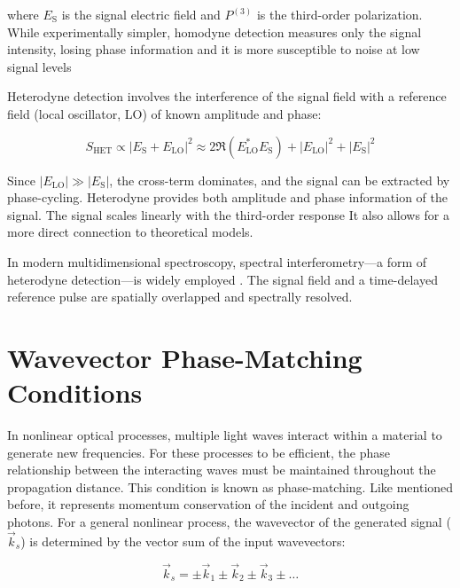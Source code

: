 \noindent where $E_{\text{S}}$ is the signal electric field and $P^{(3)}$ is the third-order polarization. While experimentally simpler, homodyne detection measures only the signal intensity, losing phase information and it is more susceptible to noise at low signal levels %

\noindent Heterodyne detection involves the interference of the signal field with a reference field (local oscillator, LO) of known amplitude and phase:

\begin{equation}
	S_{\text{HET}} \propto |E_{\text{S}} + E_{\text{LO}}|^2 \approx 2\Re{(E_{\text{LO}}^*E_{\text{S}})} + |E_{\text{LO}}|^2 + |E_{\text{S}}|^2
	\label{eq:heterodyne}
\end{equation}

\noindent Since $|E_{\text{LO}}| \gg |E_{\text{S}}|$, the cross-term dominates, and the signal can be extracted by phase-cycling. Heterodyne provides both amplitude and phase information of the signal. The signal scales linearly with the third-order response   It also allows for a more direct connection to theoretical models. 

\noindent In modern multidimensional spectroscopy, spectral interferometry—a form of heterodyne detection—is widely employed \cite{hybletal1998twodimensionalelectronicspectroscopy}. The signal field and a time-delayed reference pulse are spatially overlapped and spectrally resolved.


\section{Wavevector Phase-Matching Conditions}
\label{sec:phase_matching}

\noindent 
In nonlinear optical processes, multiple light waves interact within a material to generate new frequencies. For these processes to be efficient, the phase relationship between the interacting waves must be maintained throughout the propagation distance. This condition is known as phase-matching.
\noindent 
Like mentioned before, it represents momentum conservation of the incident and outgoing photons. For a general nonlinear process, the wavevector of the generated signal ($\vec{k}_s$) is determined by the vector sum of the input wavevectors:

\begin{equation}
	\vec{k}_s = \pm\vec{k}_1 \pm\vec{k}_2 \pm\vec{k}_3 \pm \ldots
	\label{eq:phase_matching}
\end{equation}

